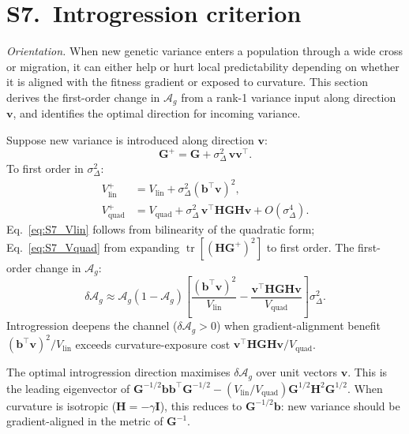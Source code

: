 \documentclass[11pt]{article}
\newcommand{\vect}[1]{\boldsymbol{#1}}
\newcommand{\mat}[1]{\mathbf{#1}}
\newcommand{\Ag}{\mathcal{A}_{g}}
\newcommand{\Vlin}{V_{\mathrm{lin}}}
\newcommand{\Vquad}{V_{\mathrm{quad}}}
\newcommand{\tr}{\operatorname{tr}}
\begin{document}
\section*{S7.~Introgression criterion}
\label{sec:introgression}

\noindent\textit{Orientation.}
When new genetic variance enters a population through a wide cross
or migration, it can either help or hurt local predictability
depending on whether it is aligned with the fitness gradient or
exposed to curvature.
This section derives the first-order change in $\Ag$ from a rank-1
variance input along direction $\vect{v}$, and identifies the
optimal direction for incoming variance.

Suppose new variance is introduced along direction $\vect{v}$:
\begin{equation}
\mat{G}^+ = \mat{G} + \sigma_\Delta^2\,\vect{v}\vect{v}^\top.
\label{eq:S7_Gplus}
\end{equation}
To first order in $\sigma_\Delta^2$:
\begin{align}
\Vlin^+ &= \Vlin + \sigma_\Delta^2(\vect{b}^\top\vect{v})^2,
\label{eq:S7_Vlin} \\[4pt]
\Vquad^+ &= \Vquad
           + \sigma_\Delta^2\,\vect{v}^\top\mat{H}\mat{G}\mat{H}\vect{v}
           + O(\sigma_\Delta^4).
\label{eq:S7_Vquad}
\end{align}
Eq.~\eqref{eq:S7_Vlin} follows from bilinearity of the quadratic
form; Eq.~\eqref{eq:S7_Vquad} from expanding
$\tr[(\mat{H}\mat{G}^+)^2]$ to first order.
The first-order change in $\Ag$:
\begin{equation}
\delta\Ag
\approx \Ag(1-\Ag)
\left[
  \frac{(\vect{b}^\top\vect{v})^2}{\Vlin}
  -
  \frac{\vect{v}^\top\mat{H}\mat{G}\mat{H}\vect{v}}{\Vquad}
\right]
\sigma_\Delta^2.
\label{eq:S7_deltaAg}
\end{equation}
Introgression deepens the channel ($\delta\Ag > 0$) when
gradient-alignment benefit
$(\vect{b}^\top\vect{v})^2/\Vlin$
exceeds curvature-exposure cost
$\vect{v}^\top\mat{H}\mat{G}\mat{H}\vect{v}/\Vquad$.

The optimal introgression direction maximises $\delta\Ag$ over unit
vectors $\vect{v}$.
This is the leading eigenvector of
$\mat{G}^{-1/2}\vect{b}\vect{b}^\top\mat{G}^{-1/2}
 - (\Vlin/\Vquad)\mat{G}^{1/2}\mat{H}^2\mat{G}^{1/2}$.
When curvature is isotropic ($\mat{H} = -\gamma\mat{I}$),
this reduces to $\mat{G}^{-1/2}\vect{b}$:
new variance should be gradient-aligned in the metric of
$\mat{G}^{-1}$.
\end{document}
